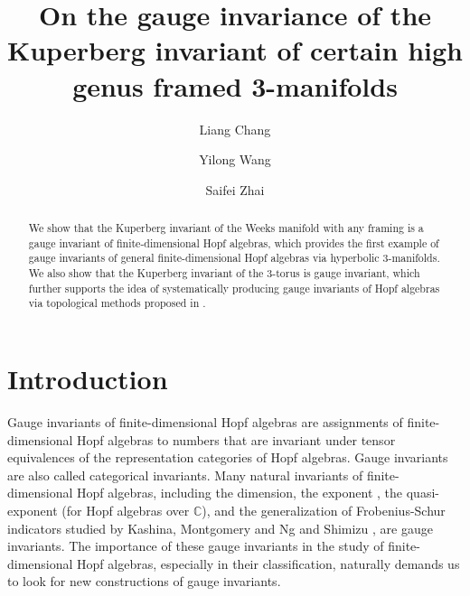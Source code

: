 \documentclass[12pt]{amsart}
\begin{document}
\title[Gauge invariance of Kuperberg invariant]
{On the gauge invariance of the Kuperberg invariant of certain high genus framed 3-manifolds}

\author{Liang Chang}
\address{School of Mathematical Sciences and LPMC\\
	Nankai University \\
	Tianjin, China}

\author{Yilong Wang}
\address{Beijing Institute of Mathematical Sciences and Applications (BIMSA)\\
	Beijing, China}

\author{Saifei Zhai}
\address{School of Mathematical Sciences and LPMC\\
	Nankai University \\
	Tianjin, China}

\begin{abstract}
We show that the Kuperberg invariant of the Weeks manifold with any framing is a gauge invariant of finite-dimensional Hopf algebras, which provides the first example of gauge invariants of general finite-dimensional Hopf algebras via hyperbolic 3-manifolds. We also show that the Kuperberg invariant of the 3-torus is gauge invariant, which further supports the idea of systematically producing gauge invariants of Hopf algebras via topological methods proposed in \cite{CNW25}.
\end{abstract}


\maketitle

\section{Introduction}
Gauge invariants of finite-dimensional Hopf algebras are assignments of finite-dimensional Hopf algebras to numbers that are invariant under tensor equivalences of the representation categories of Hopf algebras. Gauge invariants are also called categorical invariants. Many natural invariants of finite-dimensional Hopf algebras, including the dimension, the exponent \cite{EG99}, the quasi-exponent \cite{EG02qexp} (for Hopf algebras over $\mathbb{C}$), and the generalization of Frobenius-Schur indicators studied by Kashina, Montgomery and Ng \cite{KMN12} and Shimizu \cite{Shi15}, are gauge invariants. The importance of these gauge invariants in the study of finite-dimensional Hopf algebras, especially in their classification, naturally demands us to look for new constructions of gauge invariants.
\end{document}
